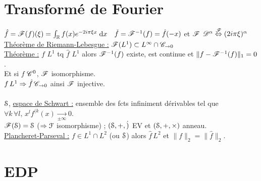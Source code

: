 \documentclass[12 pt]{book}
\begin{document}
\section*{Transformé de Fourier}
$\hat{f}=\mathscr{F}(f)(\xi) = \int_{\mathbb{R}} f(x) e^{-2i\pi \xi x} \; \text{d}x$ \ $\check{f}=\mathscr{F}^{-1}(f) = \hat{f}(-x)$ et $\mathscr{F}$ \quad $\mathscr{D}^\alpha \overset{\mathscr{F}}{\Leftrightarrow} (2i\pi\xi)^\alpha$\\
\underline{Théorème de Riemann-Lebesgue :} $\mathscr{F}(L^1) \subset L^\infty \cap \mathscr{C}_{\to 0}$\\
\underline{Théorème :} $f$ $L^1$ tq $\hat{f}$ $L^1$ alors $\mathscr{F}^{-1}(f)$ existe, est continue et $\| f - \mathscr{F}^{-1}(f)\|_1 = 0$.\\ Et si $f$ $\mathscr{C}^0$, $\mathscr{F}$ isomorphisme.\\
$f \, L^1 \Rightarrow \hat{f} \, \mathscr{C}_{\rightarrow 0}$ ainsi $\mathscr{F}$ injective.\\
\\
$\mathcal{S}$, \underline{espace de Schwart :} ensemble des fcts infiniment dérivables tel que $\forall k\,\forall l,\, x^l f^{(k}(x) \underset{\pm\infty}{\longrightarrow} 0$.\\
$\mathscr{F}(\mathcal{S})=\mathcal{S}$ ($\Rightarrow \mathcal{F}$ isomorphisme) ; $(\mathcal{S}, +, \dot)$ EV et $(\mathcal{S},+,\times)$ anneau.\\
\underline{Plancheret-Parseval :} $f\in L^1\cap L^2$ (ou $\mathcal{S}$) alors $\hat{f}\, L^2$ et $\|f\|_2 = \|\hat{f}\|_2$.\\

\section*{EDP}
\end{document}

